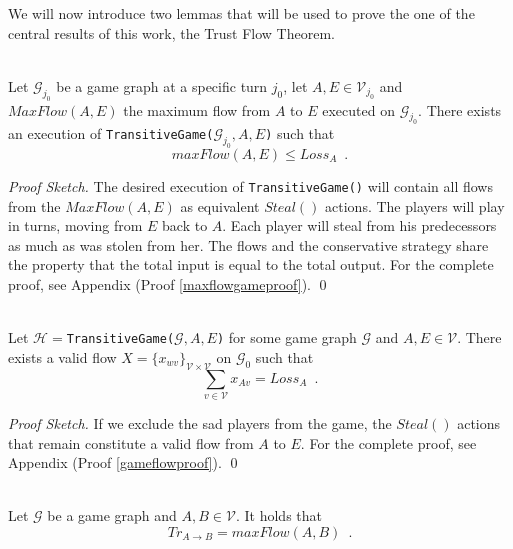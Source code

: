 \documentclass[11pt]{llncs}
\theoremstyle{definition}
\newenvironment{proofsketch}{\textit{Proof Sketch.}}{\qed \bigskip \ \\}
\begin{document}
    We will now introduce two lemmas that will be used to prove the one of the central results of this work, the Trust Flow
    Theorem.
    \begin{lemma} \ \\
       \label{maxflowgame}
       Let $\mathcal{G}_{j_0}$ be a game graph at a specific turn $j_0$, let $A, E \in \mathcal{V}_{j_0}$ and
       $MaxFlow\left(A, E\right)$ the maximum flow from $A$ to $E$ executed on $\mathcal{G}_{j_0}$. There exists an execution
       of \texttt{TransitiveGame(}$\mathcal{G}_{j_0}, A, E$\texttt{)} such that
       \begin{equation}
          maxFlow\left(A, E\right) \leq Loss_A \enspace.
       \end{equation}
    \end{lemma}
    \begin{proofsketch}
       The desired execution of \texttt{TransitiveGame()} will contain all flows from the $MaxFlow\left(A, E\right)$ as
       equivalent $Steal\left(\right)$ actions. The players will play in turns, moving from $E$ back to $A$. Each player will
       steal from his predecessors as much as was stolen from her. The flows and the conservative strategy share the property
       that the total input is equal to the total output. For the complete proof, see Appendix
       (Proof \ref{maxflowgameproof}).
    \end{proofsketch}
    \begin{lemma} \ \\
       \label{gameflow}
       Let $\mathcal{H} = $\texttt{TransitiveGame(}$\mathcal{G}, A, E$\texttt{)} for some game graph $\mathcal{G}$ and $A,
       E \in \mathcal{V}$. There exists a valid flow
       $X = \{x_{wv}\}_{\mathcal{V} \times \mathcal{V}}$ on $\mathcal{G}_0$ such that
       \begin{equation}
          \sum\limits_{v \in \mathcal{V}}x_{Av} = Loss_A \enspace.
       \end{equation}
    \end{lemma}
    \begin{proofsketch}
       If we exclude the sad players from the game, the $Steal\left(\right)$ actions that remain constitute a valid flow from
       $A$ to $E$. For the complete proof, see Appendix (Proof \ref{gameflowproof}).
    \end{proofsketch}
    \begin{theorem} \ \\
       \label{trustflow}
       Let $\mathcal{G}$ be a game graph and $A, B \in \mathcal{V}$. It holds that
       \begin{equation}
          Tr_{A \rightarrow B} = maxFlow\left(A, B\right) \enspace.
       \end{equation}
    \end{theorem}
\end{document}
